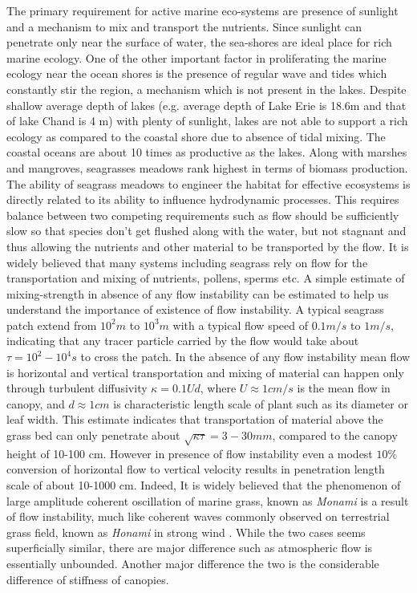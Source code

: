\documentclass[12pt]{report}   %
\begin{document}
The primary requirement for active marine eco-systems are presence of sunlight and a mechanism to mix and transport the nutrients. Since sunlight can penetrate only near the surface of water, the sea-shores are ideal place for rich marine ecology. One of the other important factor in proliferating the marine ecology near the ocean shores is the presence of regular wave and tides which constantly stir the region, a mechanism which is not present in the lakes. Despite shallow average depth of lakes (e.g. average depth of Lake Erie is 18.6m and that of lake Chand is 4 m) with plenty of sunlight, lakes are not able to support a rich ecology as compared to the coastal shore due to absence of tidal mixing. The coastal oceans are about 10 times as productive as the lakes\cite{nixon1988}. Along with marshes and mangroves, seagrasses meadows rank highest in terms of biomass production.
\newline
The ability of seagrass meadows to engineer the habitat for effective ecosystems is directly related to its ability to influence hydrodynamic processes. This requires balance between
two competing requirements such as flow should be sufficiently slow so that species don't get flushed along with the water, but not stagnant and thus allowing the nutrients and other material to be transported by the flow. It is widely believed that many systems including seagrass rely on flow for the transportation and mixing of nutrients, pollens, sperms etc. A simple estimate of mixing-strength in absence of any flow instability can be estimated to help us understand the importance of existence of flow instability. A typical seagrass patch extend from $10^2 m$ to $10^3 m$ with a typical flow speed of $0.1 m/s$ to $1 m/s$, indicating that any tracer particle carried by the flow would take about $\tau = 10^2-10^4 s$ to cross the patch. In the absence of any flow instability mean flow is horizontal and vertical transportation and mixing of material can happen only through turbulent diffusivity $\kappa =  0.1 U d$, where $ U \approx 1 cm/s$ is the mean flow in canopy, and $d \approx 1cm $ is characteristic 
length scale of plant such as its diameter or leaf width\cite{Nepf99}. This estimate indicates that transportation of material above the grass bed can only penetrate about $\sqrt{\kappa \tau} = 3-30 mm $, compared to the canopy height of 10-100 cm. However in presence of flow instability even a modest $10\%$ conversion of horizontal flow to vertical velocity results in penetration length scale of about 10-1000 cm. Indeed, It is widely believed that the phenomenon of large amplitude coherent oscillation of marine grass, known as \textit{Monami} is a result of flow instability, much like coherent waves commonly observed on terrestrial grass field, known as \textit{Honami} in strong wind \cite{Inoue55_1, Inoue55_2, Raupach96, Delangre06}. While the two cases seems superficially similar, there are major difference such as atmospheric flow is essentially unbounded. Another major difference the two is the considerable difference of stiffness of canopies.
\end{document}
